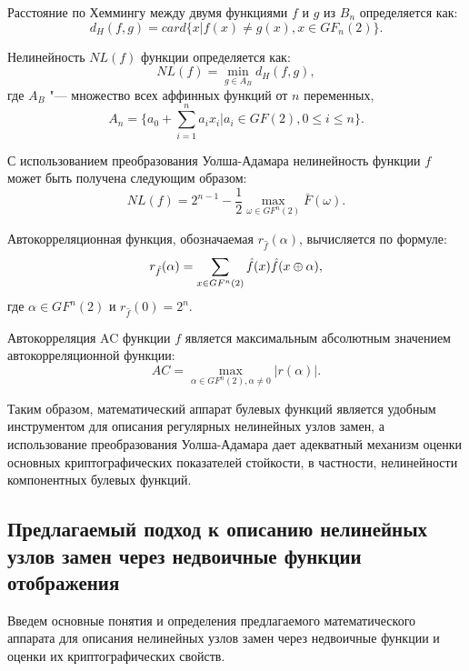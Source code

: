 Расстояние по Хеммингу между двумя функциями $f$ и $g$ из $B_n$ определяется
как:
\begin{equation}d_H(f, g) = card\{x | f(x) \neq g(x), x \in
GF_n(2)\}.\end{equation}

Нелинейность $NL(f)$ функции определяется как:
\begin{equation}NL(f) = \min_{g \in A_B}{d_H(f, g)},\end{equation}
где $A_B$ "--- множество всех аффинных функций от $n$ переменных,
\begin{equation}A_n = \{a_0 + \sum^{n}_{i=1}{a_i x_i} | a_i \in GF(2), 0 \leq i
\leq n\}.\end{equation}

С использованием преобразования Уолша-Адамара нелинейность функции $f$ может
быть получена следующим образом:
\begin{equation}NL(f) = 2^{n-1} - \frac{1}{2} \max_{\omega \in
GF^n(2)}{\bar{F}(\omega)}.\end{equation}

Автокорреляционная функция, обозначаемая $r_{\hat{f}}(\alpha)$, вычисляется по
формуле:
\begin{equation}r_{\hat{f}}(\alpha) = \sum_{x \in GF^n(2)}{\hat{f}(x)\hat{f}(x
\oplus \alpha)},\end{equation}
где $\alpha \in GF^n(2)$ и $r_{\hat{f}}(0) = 2^n$.

Автокорреляция AC функции $f$ является максимальным абсолютным значением
автокорреляционной функции:
\begin{equation}AC = \max_{\alpha \in GF^n(2), \alpha \neq 0}{|r(\alpha)|}.\end{equation}

Таким образом, математический аппарат булевых функций является удобным
инструментом для описания регулярных нелинейных узлов замен, а использование
преобразования Уолша-Адамара дает адекватный механизм оценки основных
криптографических показателей стойкости, в частности, нелинейности компонентных
булевых функций.

\subsection{Предлагаемый подход к описанию нелинейных узлов замен через недвоичные функции
отображения}

Введем основные понятия и определения предлагаемого математического аппарата для
описания нелинейных узлов замен через недвоичные функции и оценки их
криптографических свойств.

